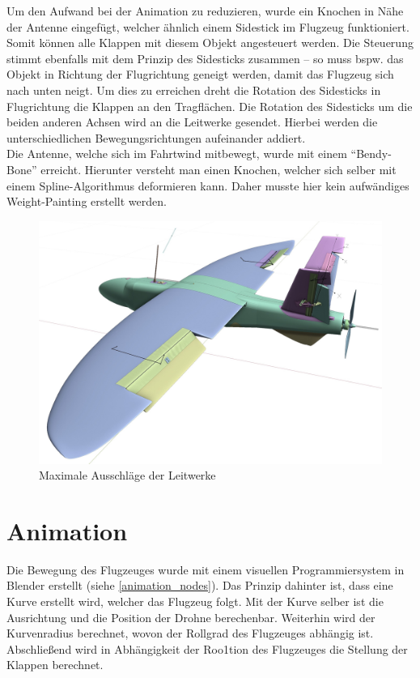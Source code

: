 Um den Aufwand bei der Animation zu reduzieren, wurde ein Knochen in Nähe der Antenne eingefügt, welcher ähnlich einem Sidestick im Flugzeug funktioniert. Somit können alle Klappen mit diesem Objekt angesteuert werden. Die Steuerung stimmt ebenfalls mit dem Prinzip des Sidesticks zusammen -- so muss bspw. das Objekt in Richtung der Flugrichtung geneigt werden, damit das Flugzeug sich nach unten neigt. Um dies zu erreichen dreht die Rotation des Sidesticks in Flugrichtung die Klappen an den Tragflächen. Die Rotation des Sidesticks um die beiden anderen Achsen wird an die Leitwerke gesendet. Hierbei werden die unterschiedlichen Bewegungsrichtungen aufeinander addiert. \\
Die Antenne, welche sich im Fahrtwind mitbewegt, wurde mit einem ``Bendy-Bone'' erreicht. Hierunter versteht man einen Knochen, welcher sich selber mit einem Spline-Algorithmus deformieren kann. Daher musste hier kein aufwändiges Weight-Painting erstellt werden.

\begin{figure}[H]
\begin{center}
\includegraphics[width=\textwidth]{gfx/prod/plane/plane8.jpg}
\caption{Maximale Ausschläge der Leitwerke}
\label{rigged_plane}
\end{center}
\end{figure}

\section{Animation}

Die Bewegung des Flugzeuges wurde mit einem visuellen Programmiersystem in Blender erstellt (siehe \autoref{animation_nodes}). Das Prinzip dahinter ist, dass eine Kurve erstellt wird, welcher das Flugzeug folgt. Mit der Kurve selber ist die Ausrichtung und die Position der Drohne berechenbar. Weiterhin wird der Kurvenradius berechnet, wovon der Rollgrad des Flugzeuges abhängig ist. Abschließend wird in Abhängigkeit der Roo1tion des Flugzeuges die Stellung der Klappen berechnet.

